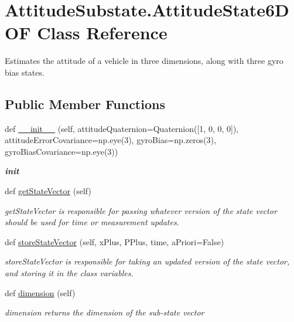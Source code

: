 \hypertarget{classAttitudeSubstate_1_1AttitudeState6DOF}{}\section{Attitude\+Substate.\+Attitude\+State6\+D\+OF Class Reference}
\label{classAttitudeSubstate_1_1AttitudeState6DOF}


Estimates the attitude of a vehicle in three dimensions, along with three gyro bias states.  


\subsection*{Public Member Functions}
\begin{DoxyCompactItemize}
\item 
def \hyperlink{classAttitudeSubstate_1_1AttitudeState6DOF_a03f5d73d42bacb8b381e637a3a679fda}{\+\_\+\+\_\+init\+\_\+\+\_\+} (self, attitude\+Quaternion=Quaternion(\mbox{[}1, 0, 0, 0\mbox{]}), attitude\+Error\+Covariance=np.\+eye(3), gyro\+Bias=np.\+zeros(3), gyro\+Bias\+Covariance=np.\+eye(3))
\begin{DoxyCompactList}\small\item\em {\bfseries init} \end{DoxyCompactList}\item 
def \hyperlink{classAttitudeSubstate_1_1AttitudeState6DOF_a8e420e4a7806669c1286a1a70ce019da}{get\+State\+Vector} (self)
\begin{DoxyCompactList}\small\item\em get\+State\+Vector is responsible for passing whatever version of the state vector should be used for time or measurement updates. \end{DoxyCompactList}\item 
def \hyperlink{classAttitudeSubstate_1_1AttitudeState6DOF_aad1116f42d28a7f8b72a621f31a2fc19}{store\+State\+Vector} (self, x\+Plus, P\+Plus, time, a\+Priori=False)
\begin{DoxyCompactList}\small\item\em store\+State\+Vector is responsible for taking an updated version of the state vector, and storing it in the class variables. \end{DoxyCompactList}\item 
def \hyperlink{classAttitudeSubstate_1_1AttitudeState6DOF_aed3a65b9959a471748426c89e7a31b4a}{dimension} (self)
\begin{DoxyCompactList}\small\item\em dimension returns the dimension of the sub-\/state vector \end{DoxyCompactList}\item 

\end{DoxyCompactItemize}
